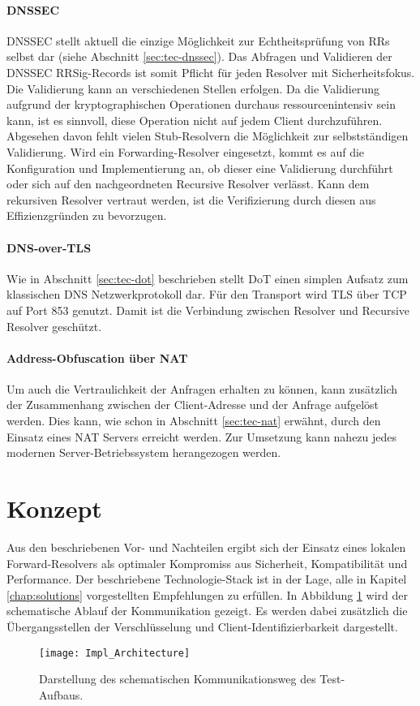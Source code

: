 \paragraph{DNSSEC}
DNSSEC stellt aktuell die einzige Möglichkeit zur Echtheitsprüfung von RRs selbst dar (siehe Abschnitt \ref{sec:tec-dnssec}). Das Abfragen und Validieren der \ac{DNSSEC} RRSig-Records ist somit Pflicht für jeden Resolver mit Sicherheitsfokus. Die Validierung kann an verschiedenen Stellen erfolgen. Da die Validierung aufgrund der kryptographischen Operationen durchaus ressourcenintensiv sein kann, ist es sinnvoll, diese Operation nicht auf jedem Client durchzuführen. Abgesehen davon fehlt vielen Stub-Resolvern die Möglichkeit zur selbstständigen Validierung. Wird ein Forwarding-Resolver eingesetzt, kommt es auf die Konfiguration und Implementierung an, ob dieser eine Validierung durchführt oder sich auf den nachgeordneten Recursive Resolver verlässt. Kann dem rekursiven Resolver vertraut werden, ist die Verifizierung durch diesen aus Effizienzgründen zu bevorzugen.

\paragraph{DNS-over-TLS}
Wie in Abschnitt \ref{sec:tec-dot} beschrieben stellt DoT einen simplen Aufsatz zum klassischen DNS Netzwerkprotokoll dar. Für den Transport wird TLS über TCP auf Port 853 genutzt\cite{rfc7858}. Damit ist die Verbindung zwischen Resolver und Recursive Resolver geschützt. 

\paragraph{Address-Obfuscation über NAT}
Um auch die Vertraulichkeit der Anfragen erhalten zu können, kann zusätzlich der Zusammenhang zwischen der Client-Adresse und der Anfrage aufgelöst werden. Dies kann, wie schon in Abschnitt \ref{sec:tec-nat} erwähnt, durch den Einsatz eines NAT Servers erreicht werden. Zur Umsetzung kann nahezu jedes modernen Server-Betriebssystem herangezogen werden.

\section{Konzept}
Aus den beschriebenen Vor- und Nachteilen ergibt sich der Einsatz eines lokalen Forward-Resolvers als optimaler Kompromiss aus Sicherheit, Kompatibilität und Performance. Der beschriebene Technologie-Stack ist in der Lage, alle in Kapitel \ref{chap:solutions} vorgestellten Empfehlungen zu erfüllen. In Abbildung \ref{img:impl-architecture} wird der schematische Ablauf der Kommunikation gezeigt. Es werden dabei zusätzlich die Übergangsstellen der Verschlüsselung und Client-Identifizierbarkeit dargestellt.
\begin{figure}[hb]
    \centering
    \texttt{[image: Impl\_Architecture]}
    \caption{Darstellung des schematischen Kommunikationsweg des Test-Aufbaus.}
    \label{img:impl-architecture}
\end{figure}

